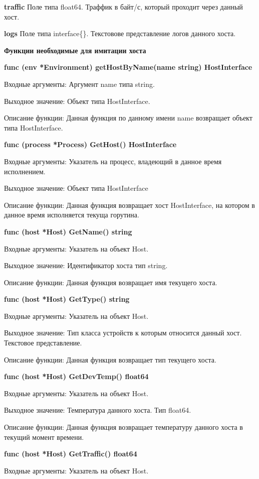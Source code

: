 \textbf{traffic} 
Поле типа float64. Траффик в байт/с, который проходит через данный хост.

\textbf{logs} 
Поле типа interface\{\}. Текстовове представление логов данного хоста.

\textbf{Функции необходимые для имитации хоста}

\textbf{func (env *Environment) getHostByName(name string) HostInterface}

Входные аргументы: Аргумент name типа string.

Выходное значение: Объект типа HostInterface.

Описание функции: Данная функция по данному имени name возвращает объект типа HostInterface.


\textbf{func (process *Process) GetHost() HostInterface }

Входные аргументы: Указатель на процесс, владеющий в данное время исполнением.

Выходное значение: Объект типа HostInterface

Описание функции: Данная функция возвращает хост HostInterface, на котором в данное время исполняется текуща горутина. 

\textbf{func (host *Host) GetName() string }

Входные аргументы: Указатель на объект Host.

Выходное значение: Идентификатор хоста тип string.

Описание функции: Данная функция возвращает имя текущего хоста.


\textbf{func (host *Host) GetType() string }

Входные аргументы: Указатель на объект Host.

Выходное значение: Тип класса устройств к которым относится данный хост. Текстовое представление.

Описание функции: Данная функция возвращает тип текущего хоста.


\textbf{func (host *Host) GetDevTemp() float64 }

Входные аргументы: Указатель на объект Host.

Выходное значение: Температура данного хоста. Тип float64.

Описание функции: Данная функция возвращает температуру данного хоста в текущий момент времени.


\textbf{func (host *Host) GetTraffic() float64}

Входные аргументы: Указатель на объект Host.

